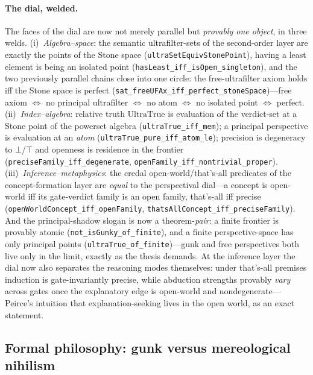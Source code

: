 \documentclass[]{article}
\theoremstyle{definition}
\theoremstyle{remark}
\newcommand{\code}[1]{\texttt{#1}}
\begin{document}
\paragraph{The dial, welded.} The faces of the dial are now not merely parallel but
\emph{provably one object}, in three welds. (i)~\emph{Algebra--space}: the semantic
ultrafilter-sets of the second-order layer are exactly the points of the Stone space
(\code{ultraSetEquivStonePoint}), having a least element is being an isolated point
(\code{hasLeast\_iff\_isOpen\_singleton}), and the two previously parallel chains close
into one circle: the free-ultrafilter axiom holds iff the Stone space is perfect
(\code{sat\_freeUFAx\_iff\_perfect\_stoneSpace})---free axiom $\Leftrightarrow$ no
principal ultrafilter $\Leftrightarrow$ no atom $\Leftrightarrow$ no isolated point
$\Leftrightarrow$ perfect. (ii)~\emph{Index--algebra}: relative truth
$\mathrm{UltraTrue}$ is evaluation of the verdict-set at a Stone point of the powerset
algebra (\code{ultraTrue\_iff\_mem}); a principal perspective is evaluation at an
\emph{atom} (\code{ultraTrue\_pure\_iff\_atom\_le}); precision is degeneracy to
$\bot$/$\top$ and openness is residence in the frontier
(\code{preciseFamily\_iff\_degenerate}, \code{openFamily\_iff\_nontrivial\_proper}).
(iii)~\emph{Inference--metaphysics}: the credal open-world/that's-all predicates of the
concept-formation layer are \emph{equal} to the perspectival dial---a concept is
open-world iff its gate-verdict family is an open family, that's-all iff precise
(\code{openWorldConcept\_iff\_openFamily}, \code{thatsAllConcept\_iff\_preciseFamily}).
And the principal-shadow slogan is now a theorem-\emph{pair}: a finite frontier is
provably atomic (\code{not\_isGunky\_of\_finite}), and a finite perspective-space has
only principal points (\code{ultraTrue\_of\_finite})---gunk and free perspectives both
live only in the limit, exactly as the thesis demands. At the inference layer the dial
now also separates the reasoning modes themselves: under that's-all premises induction
is gate-invariantly precise, while abduction strengths provably \emph{vary} across
gates once the explanatory edge is open-world and nondegenerate---Peirce's intuition
that explanation-seeking lives in the open world, as an exact statement.

\subsection{Formal philosophy: gunk versus mereological nihilism}
\label{sec:sider}
\end{document}
